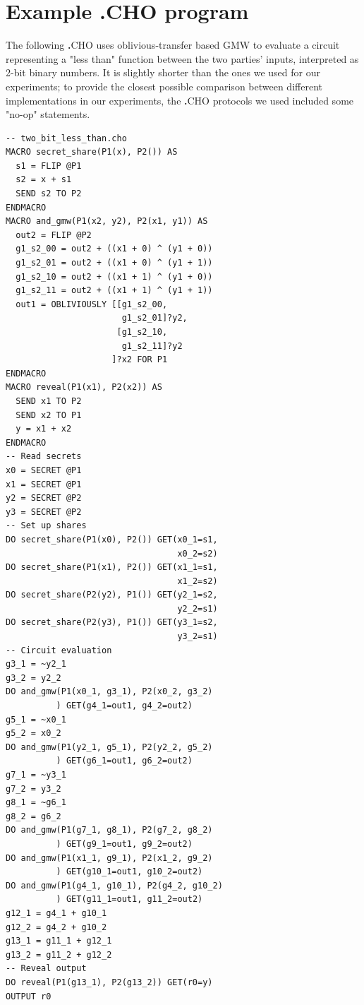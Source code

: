 \documentclass[acmlarge, manuscript, screen, review, anonymous, table]{acmart}
\newcommand{\langname}{\textsc{\textbf{.}CHO}\xspace}
\begin{document}


\section{Example \langname program}\label{sec:example-big}

The following \langname uses oblivious-transfer based GMW to evaluate a circuit representing a "less than" function
between the two parties' inputs, interpreted as 2-bit binary numbers.
It is slightly shorter than the ones we used for our experiments;
to provide the closest possible comparison between different implementations in our experiments,
the \langname protocols we used included some "no-op" statements.

\begin{small}
\begin{verbatim}
-- two_bit_less_than.cho
MACRO secret_share(P1(x), P2()) AS
  s1 = FLIP @P1
  s2 = x + s1
  SEND s2 TO P2
ENDMACRO
MACRO and_gmw(P1(x2, y2), P2(x1, y1)) AS
  out2 = FLIP @P2
  g1_s2_00 = out2 + ((x1 + 0) ^ (y1 + 0))
  g1_s2_01 = out2 + ((x1 + 0) ^ (y1 + 1))
  g1_s2_10 = out2 + ((x1 + 1) ^ (y1 + 0))
  g1_s2_11 = out2 + ((x1 + 1) ^ (y1 + 1))
  out1 = OBLIVIOUSLY [[g1_s2_00,
                       g1_s2_01]?y2,
                      [g1_s2_10,
                       g1_s2_11]?y2
                     ]?x2 FOR P1
ENDMACRO
MACRO reveal(P1(x1), P2(x2)) AS
  SEND x1 TO P2
  SEND x2 TO P1
  y = x1 + x2
ENDMACRO
-- Read secrets
x0 = SECRET @P1
x1 = SECRET @P1
y2 = SECRET @P2
y3 = SECRET @P2
-- Set up shares
DO secret_share(P1(x0), P2()) GET(x0_1=s1,
                                  x0_2=s2)
DO secret_share(P1(x1), P2()) GET(x1_1=s1,
                                  x1_2=s2)
DO secret_share(P2(y2), P1()) GET(y2_1=s2,
                                  y2_2=s1)
DO secret_share(P2(y3), P1()) GET(y3_1=s2,
                                  y3_2=s1)
-- Circuit evaluation
g3_1 = ~y2_1
g3_2 = y2_2
DO and_gmw(P1(x0_1, g3_1), P2(x0_2, g3_2)
          ) GET(g4_1=out1, g4_2=out2)
g5_1 = ~x0_1
g5_2 = x0_2
DO and_gmw(P1(y2_1, g5_1), P2(y2_2, g5_2)
          ) GET(g6_1=out1, g6_2=out2)
g7_1 = ~y3_1
g7_2 = y3_2
g8_1 = ~g6_1
g8_2 = g6_2
DO and_gmw(P1(g7_1, g8_1), P2(g7_2, g8_2)
          ) GET(g9_1=out1, g9_2=out2)
DO and_gmw(P1(x1_1, g9_1), P2(x1_2, g9_2)
          ) GET(g10_1=out1, g10_2=out2)
DO and_gmw(P1(g4_1, g10_1), P2(g4_2, g10_2)
          ) GET(g11_1=out1, g11_2=out2)
g12_1 = g4_1 + g10_1
g12_2 = g4_2 + g10_2
g13_1 = g11_1 + g12_1
g13_2 = g11_2 + g12_2
-- Reveal output
DO reveal(P1(g13_1), P2(g13_2)) GET(r0=y)
OUTPUT r0
\end{verbatim}
\end{small}
\end{document}
